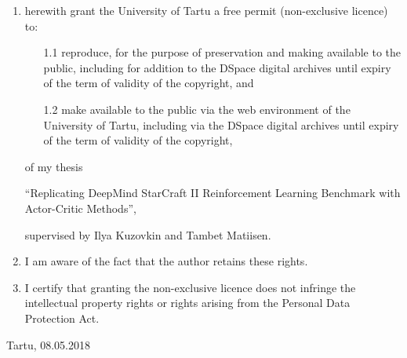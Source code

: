\begin{enumerate}
\item
herewith grant the University of Tartu a free permit (non-exclusive licence) to:
\begin{enumerate}
\item[1.1]
reproduce, for the purpose of preservation and making available to the public, including for addition to the DSpace digital archives until expiry of the term of validity of the copyright, and
\item[1.2]
make available to the public via the web environment of the University of Tartu, including via the DSpace digital archives until expiry of the term of validity of the copyright,
\end{enumerate}

of my thesis

``Replicating DeepMind StarCraft II Reinforcement Learning Benchmark with Actor-Critic Methods'',

supervised by Ilya Kuzovkin and Tambet Matiisen.

\item
I am aware of the fact that the author retains these rights.
\item
I certify that granting the non-exclusive licence does not infringe the intellectual property rights or rights arising from the Personal Data Protection Act. 
\end{enumerate}

\noindent
Tartu, 08.05.2018